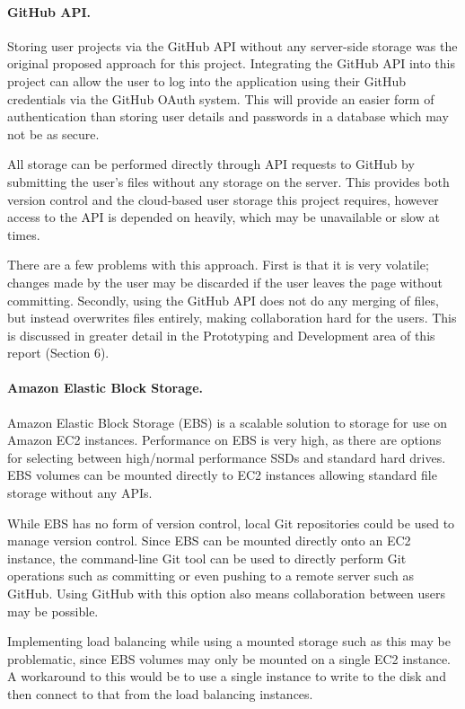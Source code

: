 \documentclass[a4paper, 12pt]{article}
\begin{document}
\paragraph{GitHub API.}
Storing user projects via the GitHub API without any server-side storage was the original proposed approach for this project.\cite{githubapi} Integrating the GitHub API into this project can allow the user to log into the application using their GitHub credentials via the GitHub OAuth system. \cite{githuboauth} This will provide an easier form of authentication than storing user details and passwords in a database which may not be as secure.

All storage can be performed directly through API requests to GitHub by submitting the user's files without any storage on the server.\cite{githubapicommit} This provides both version control and the cloud-based user storage this project requires, however access to the API is depended on heavily, which may be unavailable or slow at times.

There are a few problems with this approach. First is that it is very volatile; changes made by the user may be discarded if the user leaves the page without committing. Secondly, using the GitHub API does not do any merging of files, but instead overwrites files entirely, making collaboration hard for the users. This is discussed in greater detail in the Prototyping and Development area of this report (Section 6).

\paragraph{Amazon Elastic Block Storage.}
Amazon Elastic Block Storage (EBS) is a scalable solution to storage for use on Amazon EC2 instances. Performance on EBS is very high, as there are options for selecting between high/normal performance SSDs and standard hard drives. EBS volumes can be mounted directly to EC2 instances allowing standard file storage without any APIs.\cite{awsebs}

While EBS has no form of version control, local Git repositories could be used to manage version control. Since EBS can be mounted directly onto an EC2 instance, the command-line Git tool can be used to directly perform Git operations such as committing or even pushing to a remote server such as GitHub. Using GitHub with this option also means collaboration between users may be possible.

Implementing load balancing while using a mounted storage such as this may be problematic, since EBS volumes may only be mounted on a single EC2 instance. A workaround to this would be to use a single instance to write to the disk and then connect to that from the load balancing instances.
\end{document}
